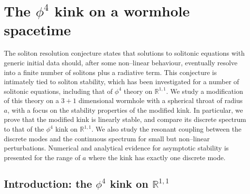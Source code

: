 \chapter{The $\phi^4$ kink on a wormhole spacetime}

\graphicspath{{Chapter3/Figs/Static/}{Chapter3/Figs/Dynamic/}}


\newtheorem{theo}{Theorem}[section] 
\newtheorem{prop}[theo]{Proposition}  

\newcommand{\koniec}{\begin{flushright}  $\Box $ \end{flushright}}

\def\p{\partial}
\def\be{\begin{equation}}
\def\ee{\end{equation}}


The soliton resolution conjecture \cite{TT} states that solutions to solitonic equations with generic initial data should, after some non--linear behaviour, eventually resolve into a finite number of solitons plus a radiative term. This conjecture is intimately tied to soliton stability, which has been investigated for a number of solitonic equations, including that of $\phi^4$ theory on $\mathbb{R}^{1,1}$. We study a modification of this theory on a $3+1$ dimensional wormhole with a spherical throat of radius $a$, with a focus on the stability properties of the modified kink. In particular, we prove that the modified kink is linearly stable, and compare its discrete spectrum to that of the $\phi^4$ kink on $\mathbb{R}^{1,1}$. We also study the resonant coupling between the discrete modes and the continuous spectrum for small but non--linear perturbations. Numerical and analytical evidence for asymptotic stability is presented for the range of $a$ where the kink has exactly one discrete mode.

\section{Introduction: the $\phi^4$ kink on $\mathbb{R}^{1,1}$}

